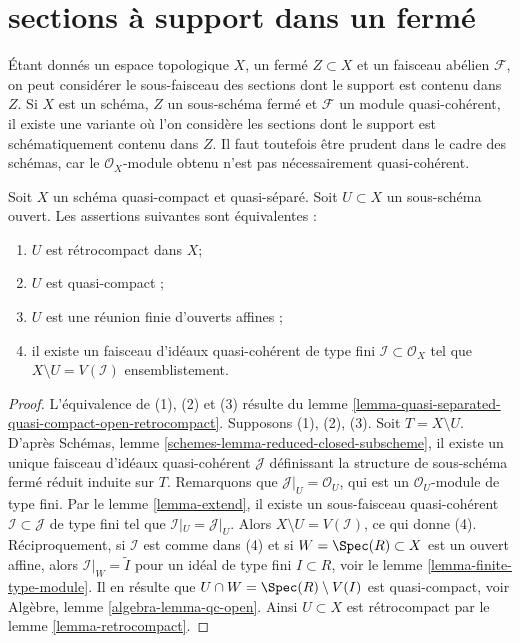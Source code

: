 \section{sections à support dans un fermé}
\label{section-sections-with-support-in-closed}

\noindent
Étant donnés un espace topologique $X$, un fermé $Z \subset X$ et un
faisceau abélien $\mathcal{F}$, on peut considérer le sous-faisceau des sections
dont le support est contenu dans $Z$. Si $X$ est un schéma, $Z$ un
sous-schéma fermé et $\mathcal{F}$ un module quasi-cohérent, il existe une variante
où l'on considère les sections dont le support est schématiquement contenu
dans $Z$. Il faut toutefois être prudent dans le cadre des
schémas, car le $\mathcal{O}_X$-module obtenu n'est pas nécessairement quasi-cohérent.

\begin{lemma}
\label{lemma-quasi-coherent-finite-type-ideals}
Soit $X$ un schéma quasi-compact et quasi-séparé.
Soit $U \subset X$ un sous-schéma ouvert. Les assertions suivantes sont équivalentes :
\begin{enumerate}
\item $U$ est rétrocompact dans $X$;
\item $U$ est quasi-compact ;
\item $U$ est une réunion finie d'ouverts affines ;
\item il existe un faisceau d'idéaux quasi-cohérent de type fini
$\mathcal{I} \subset \mathcal{O}_X$ tel que $X \setminus U = V(\mathcal{I})$
ensemblistement.
\end{enumerate}
\end{lemma}

\begin{proof}
L'équivalence de (1), (2) et (3) résulte du
lemme \ref{lemma-quasi-separated-quasi-compact-open-retrocompact}.
Supposons (1), (2), (3). Soit $T = X \setminus U$.
D'après Schémas, lemme \ref{schemes-lemma-reduced-closed-subscheme}, il existe
un unique faisceau d'idéaux quasi-cohérent $\mathcal{J}$ définissant
la structure de sous-schéma fermé réduit induite sur $T$.
Remarquons que $\mathcal{J}|_U = \mathcal{O}_U$, qui est un
$\mathcal{O}_U$-module de type fini. Par
le lemme \ref{lemma-extend}, il existe un sous-faisceau quasi-cohérent
$\mathcal{I} \subset \mathcal{J}$ de type
fini tel que $\mathcal{I}|_U = \mathcal{J}|_U$.
Alors $X \setminus U = V(\mathcal{I})$, ce qui donne (4). Réciproquement,
si $\mathcal{I}$ est comme dans (4) et si $W = \Spec(R) \subset X$ est un ouvert
affine, alors $\mathcal{I}|_W = \widetilde{I}$ pour un idéal de type
fini $I \subset R$, voir le lemme \ref{lemma-finite-type-module}.
Il en résulte que $U \cap W = \Spec(R) \setminus V(I)$ est quasi-compact,
voir Algèbre, lemme \ref{algebra-lemma-qc-open}. Ainsi $U \subset X$
est rétrocompact par le lemme \ref{lemma-retrocompact}.
\end{proof}

